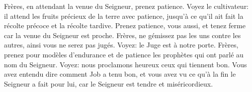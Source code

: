Frères, en attendant la venue du Seigneur, prenez patience.
Voyez le cultivateur:
	il attend les fruits précieux de la terre avec patience,
	jusqu’à ce qu’il ait fait la récolte précoce et la récolte tardive.
Prenez patience, vous aussi,
	et tenez ferme car la venue du Seigneur est proche.
Frères, ne gémissez pas les uns contre les autres,
	ainsi vous ne serez pas jugés.
	Voyez: le Juge est à notre porte.
Frères, prenez pour modèles d’endurance et de patience
	les prophètes qui ont parlé au nom du Seigneur.
Voyez: nous proclamons heureux ceux qui tiennent bon.
	Vous avez entendu dire comment Job a tenu bon,
	et vous avez vu ce qu’à la fin le Seigneur a fait pour lui,
	car le Seigneur est tendre et miséricordieux.

